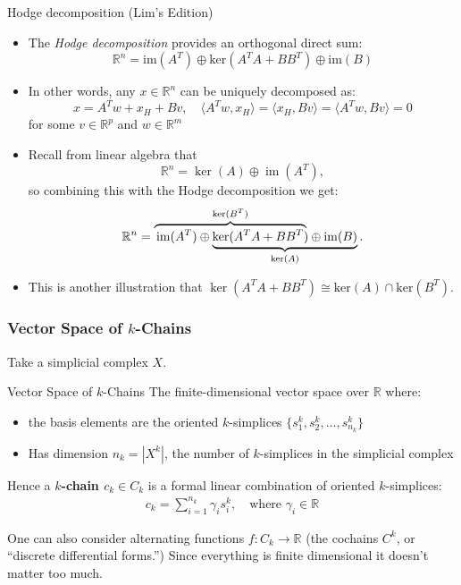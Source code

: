 \documentclass[aspectratio=169,xcolor=dvipsnames]{beamer}
\DeclareMathOperator{\im}{im}
\begin{document}
\begin{frame}{Hodge decomposition (Lim's Edition)}
\begin{itemize}
    \item The \textit{Hodge decomposition} provides an orthogonal direct sum:
        \begin{equation*}
            \mathbb{R}^n = \text{im}(A^T) \oplus \text{ker}(A^TA + BB^T) \oplus \text{im}(B)
        \end{equation*}
\item In other words, any $x \in \mathbb{R}^n$ can be uniquely decomposed as:
        \begin{equation*}
            x = A^Tw + x_H + Bv, \quad \langle A^Tw, x_H \rangle = \langle x_H, Bv \rangle = \langle A^Tw, Bv \rangle = 0
        \end{equation*}
        for some $v \in \mathbb{R}^p$ and $w \in \mathbb{R}^m$

\item Recall from linear algebra that \[
\mathbb R^n = \ker(A)\oplus \im(A^T),
\]
so combining this with the Hodge decomposition we get: 
    \[
\mathbb{R}^n = \rlap{$\overbrace{\phantom{\im(A^T) \oplus \ker(A^TA + BB^T)}}^{\ker(B^T)}$}\im(A^T) \oplus \underbrace{\ker(A^TA + BB^T) \oplus \im(B)}_{\ker(A)}.
\]
\item This is another illustration that \(\ker(A^TA + BB^T)\cong \text{ker}(A) \cap \text{ker}(B^T)\).
\end{itemize}

\end{frame}

\begin{frame}
\frametitle{Vector Space of $k$-Chains}

Take a simplicial complex $X$. 

\begin{block}{Vector Space of $k$-Chains}
    The finite-dimensional vector space over $\mathbb{R}$ where:
    \begin{itemize}
        \item the basis elements are the oriented $k$-simplices $\{s_1^k, s_2^k, \ldots, s_{n_k}^k\}$
        \item Has dimension $n_k = |X^k|$, the number of $k$-simplices in the simplicial complex
    \end{itemize}
\end{block}
Hence a \textbf{$k$-chain $c_k \in C_k$} is a formal linear combination of oriented $k$-simplices:
    \begin{align*}
        c_k = \sum_{i=1}^{n_k} \gamma_i s_i^k, \quad \text{where } \gamma_i \in \mathbb{R}
    \end{align*}

One can also consider alternating functions $f:C_k\to\mathbb R$ (the cochains $C^k$, or ``discrete differential forms.'') Since everything is finite dimensional it doesn't matter too much.
\end{frame}
\end{document}

